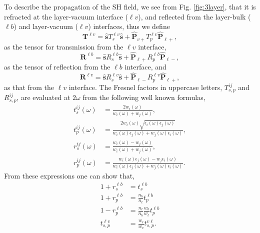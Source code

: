 To describe the propagation of the SH field, we see from Fig. \ref{fig:3layer},
that it is refracted at the layer-vacuum interface ($\ell v$), and  reflected
from the layer-bulk ($\ell b$) and layer-vacuum ($\ell v$) interfaces, thus we
define
\begin{equation}\label{r5}
\mathbf{T}^{\ell v}
= \hat{\mathbf{s}}T_{s}^{\ell v}\hat{\mathbf{s}} 
+ \hat{\mathbf{P}}_{v+}T_{p}^{\ell v}\hat{\mathbf{P}}_{\ell +},
\end{equation}
as the tensor for transmission from the $\ell v$ interface,
\begin{equation}\label{r6}
\mathbf{R}^{\ell b}
= \hat{\mathbf{s}}R_{s}^{\ell b}\hat{\mathbf{s}}
+ \hat{\mathbf{P}}_{\ell +}R_{p}^{\ell b}\hat{\mathbf{P}}_{\ell -},
\end{equation} 
as the tensor of reflection from the $\ell b$ interface, and
\begin{equation}\label{r6b}
\mathbf{R}^{\ell v}
= \hat{\mathbf{s}}R_{s}^{\ell v}\hat{\mathbf{s}}
+ \hat{\mathbf{P}}_{\ell -}R_{p}^{\ell v}\hat{\mathbf{P}}_{\ell +},
\end{equation} 
as that from the $\ell v$ interface. The Fresnel factors in uppercase letters,
$T^{ij}_{s,p}$ and $R^{ij}_{s,p}$, are evaluated at $2\omega$ from the following
well known formulas,\cite{ mizrahiJOSA88}
\begin{align}
t_s^{ij}(\omega) &=
\frac{2w_{i}(\omega)}{w_{i}(\omega)+w_{j}(\omega)},\\
t_{p}^{ij}(\omega) &=
\frac{2w_{i}(\omega)\sqrt{\epsilon_{i}(\omega)\epsilon_j(\omega)}}
     {w_{i}(\omega)\epsilon_{j}(\omega)+w_{j}(\omega)\epsilon_{i}(\omega)},\\
r_s^{ij}(\omega) &=
\frac{w_{i}(\omega) - w_{j}(\omega)}
     {w_{i}(\omega) + w_{j}(\omega)},\\
r_{p}^{ij}(\omega) &=
\frac{w_{i}(\omega)\epsilon_{j}(\omega) - w_{j}\epsilon_{i}(\omega)}
     {w_{i}(\omega)\epsilon_{j}(\omega) + w_{j}(\omega)\epsilon_{i}(\omega)}. 
\end{align}
From these expressions one can show that,
\begin{align}\label{mf}
1 + r^{\ell b}_{s} &= t^{\ell b}_{s}\nonumber\\
1 + r^{\ell b}_{p}
&= \frac{n_b}{n_\ell} 
t^{\ell b}_{p} 
\nonumber\\ 
1 - r^{\ell b}_{p}
&= \frac{n_\ell}{n_b}
   \frac{w_{b}}{w_{\ell}}t^{\ell b}_{p}\\ 
t^{\ell v}_{s,p} &= \frac{w_{\ell}}{w_{v}}t^{v\ell}_{s,p}\nonumber
.
\end{align}

